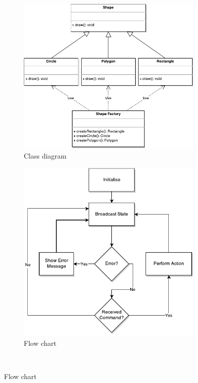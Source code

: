 
\begin{figure}
\centering
\begin{subfigure}{.5\textwidth}
\centering
  \includegraphics[width=.95\linewidth]{../images/code-visualisations/class-diagram.pdf}
  \caption{Class diagram}
  \label{fig:class-diagram}
\end{subfigure}%
\begin{subfigure}{.5\textwidth}
\centering
  \includegraphics[width=.8\linewidth]{../images/code-visualisations/flow-chart.pdf}
  \caption{Flow chart}
  \label{fig:flow-chart}
\end{subfigure}\\
\vspace{5mm}


\end{figure}
